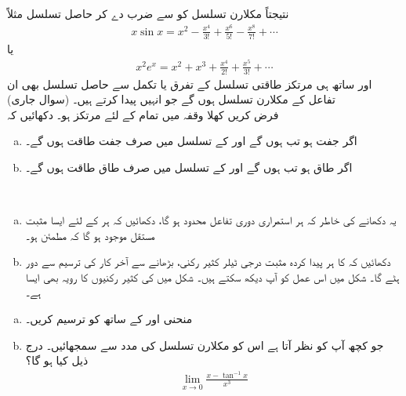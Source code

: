 نتیجتاً مکلارن تسلسل کو  سے ضرب دے کر حاصل تسلسل مثلاً 
\begin{align*}
x\sin x=x^2-\frac{x^4}{3!}+\frac{x^6}{5!}-\frac{x^8}{7!}+\cdots
\end{align*}
یا 
\begin{align*}
x^2e^x=x^2+x^3+\frac{x^4}{2!}+\frac{x^5}{3!}+\cdots
\end{align*}
اور ساتھ ہی مرتکز طاقتی تسلسل کے تفرق یا تکمل سے حاصل تسلسل بھی ان تفاعل کے مکلارن تسلسل ہوں گے جو انہیں پیدا کرتے ہیں۔
 (سوال  جاری)\\
 فرض کریں  کھلا وقفہ  میں تمام  کے لئے  مرتکز ہو۔ دکھائیں کہ
\begin{enumerate}[a.]
\item
اگر  جفت ہو تب  ہوں گے اور  کے تسلسل میں صرف جفت طاقت ہوں گے۔
\item
اگر  طاق ہو تب  ہوں گے اور  کے تسلسل میں صرف طاق طاقت ہوں گے۔
\end{enumerate}
\\
\begin{enumerate}[a.]
\item
یہ دکھانے کی خاطر کہ ہر استمراری دوری تفاعل  محدود ہو گا، دکھائیں کہ ہر  کے لئے ایسا مثبت مستقل  موجود ہو گا کہ   مطمئن ہو۔
\item
دکھائیں کہ  کا ہر پیدا کردہ مثبت درجی ٹیلر کثیر رکنی،   بڑھانے سے آخر کار  کی ترسیم سے دور ہٹے گا۔ شکل  میں اس عمل کو آپ دیکھ سکتے ہیں۔  شکل  میں  کی کثیر رکنیوں کا رویہ بھی ایسا ہے۔
\end{enumerate}
\begin{enumerate}[a.]
\item
منحنی  اور  کے ساتھ  کو ترسیم کریں۔
\item
جو کچھ آپ کو نظر آتا ہے اس کو مکلارن تسلسل کی مدد سے سمجھائیں۔ درج ذیل کیا ہو گا؟
\begin{align*}
\lim_{x\to 0}\tfrac{x-\tan^{-1}x}{x^3}
\end{align*} 
\end{enumerate}

